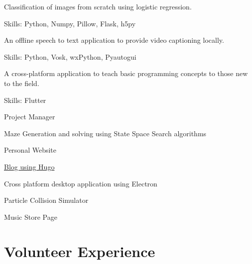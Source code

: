 \documentclass[]{absolute}
\begin{document}
\begin{minipage}[t]{0.65\textwidth}
    \begin{tightemize}
        \item Classification of images from scratch using logistic regression.
        \item Skills: Python, Numpy, Pillow, Flask, h5py
    \end{tightemize}
    \sectionsep

    \begin{tightemize}
        \item An offline speech to text application to provide video captioning locally.
        \item Skills: Python, Vosk, wxPython, Pyautogui
    \end{tightemize}
    \sectionsep

    \begin{tightemize}
        \item A cross-platform application to teach basic programming concepts to those new to the field.
        \item Skills: Flutter
    \end{tightemize}
    \sectionsep

    \begin{tightemize}
        \item Project Manager
        \item Maze Generation and solving using State Space Search algorithms
        \item Personal Website
        \item \href{https://code-explorer.github.io/blog/}{Blog using Hugo}
        \item Cross platform desktop application using Electron
        \item Particle Collision Simulator
        \item Music Store Page
    \end{tightemize}
    \sectionsep


    \section{Volunteer Experience}


\end{minipage}
\end{document}
